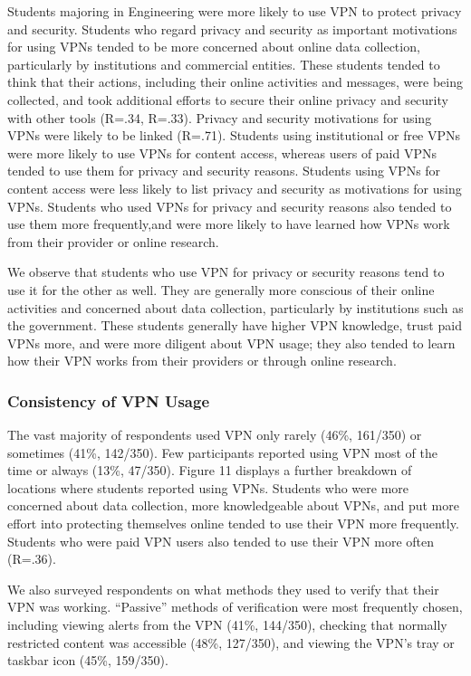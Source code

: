 Students majoring in Engineering were more likely to use VPN to protect
privacy and security. Students who regard privacy and security as important
motivations for using VPNs tended to be more concerned about online data
collection, particularly by institutions and commercial entities. These
students tended to think that their actions, including their online activities
and messages, were being collected, and took additional efforts to secure
their online privacy and security with other tools (R=.34, R=.33). Privacy and
security motivations for using VPNs were likely to be linked (R=.71). Students
using institutional or free VPNs were more likely to use VPNs for content
access, whereas users of paid VPNs tended to use them for privacy and security
reasons. Students using VPNs for content access were less likely to list
privacy and security as motivations for using VPNs. Students who used VPNs for
privacy and security reasons also tended to use them more frequently,and were
more likely to have learned how VPNs work from their provider or online
research. 

We observe that students who use VPN for privacy or security reasons tend to
use it for the other as well. They are generally more conscious of their
online activities and concerned about data collection, particularly by
institutions such as the government. These students generally have higher VPN
knowledge, trust paid VPNs more, and were more diligent about VPN usage; they
also tended to learn how their VPN works from their providers or through
online research.

\subsubsection{Consistency of VPN Usage}

The vast majority of respondents used VPN only rarely (46\%, 161/350) or
sometimes (41\%, 142/350). Few participants reported using VPN most of the
time or always (13\%, 47/350). Figure 11 displays a further breakdown of
locations where students reported using VPNs. Students who were more concerned
about data collection, more knowledgeable about VPNs, and put more effort into
protecting themselves online tended to use their VPN more frequently. Students
who were paid VPN users also tended to use their VPN more often (R=.36).

We also surveyed respondents on what methods they used to verify that their
VPN was working. “Passive” methods of verification were most frequently
chosen, including viewing alerts from the VPN (41\%, 144/350), checking that
normally restricted content was accessible (48\%, 127/350), and viewing the
VPN’s tray or taskbar icon (45\%, 159/350).

